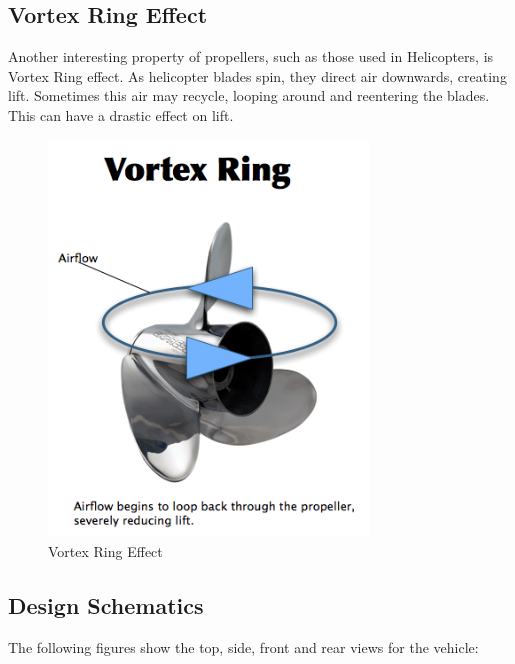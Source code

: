 \subsection{Vortex Ring Effect}
Another interesting property of propellers, such as those used in Helicopters, is Vortex Ring effect. As helicopter blades spin, they direct air downwards, creating lift. Sometimes this air may recycle, looping around and reentering the blades. This can have a drastic effect on lift.

\begin{figure}[h]
  \begin{center}
    \includegraphics[width=85mm]{imageSources/vortexRing.png}
  \end{center}
  \caption{Vortex Ring Effect} 
  \label{vortexRing}
\end{figure}

\subsection{Design Schematics}

The following figures show the top, side, front and rear views for the vehicle:

